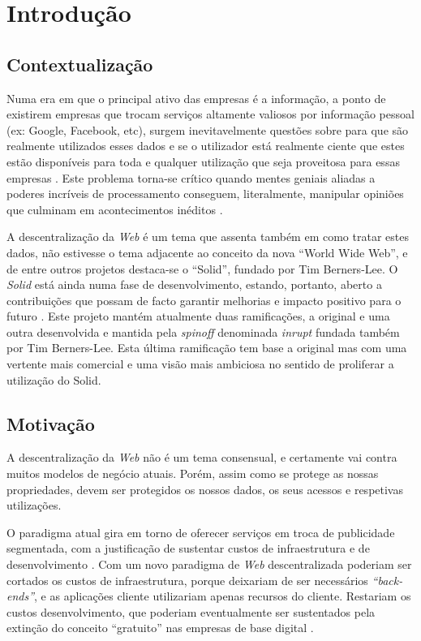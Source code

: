 \chapter{Introdução}
\label{cap:1}

\section{Contextualização}
Numa era em que o principal ativo das empresas é a informação, a ponto de existirem empresas que trocam serviços altamente valiosos por informação pessoal (ex: Google, Facebook, etc)\cite{top_three_issues_centralized_web}, surgem inevitavelmente questões sobre para que são realmente utilizados esses dados e se o utilizador está realmente ciente que estes estão disponíveis para toda e qualquer utilização que seja proveitosa para essas empresas \cite{facebook_data_hell_medium}. Este problema torna-se crítico quando mentes geniais aliadas a poderes incríveis de processamento conseguem, literalmente, manipular opiniões que culminam em acontecimentos inéditos \cite{cambridge_analytica}.

A descentralização da \emph{Web} é um tema que assenta também em como tratar estes dados, não estivesse o tema adjacente ao conceito da nova “World Wide Web”, e de entre outros projetos destaca-se o “Solid”, fundado por Tim Berners-Lee. O \emph{Solid} está ainda numa fase de desenvolvimento, estando, portanto, aberto a contribuições que possam de facto garantir melhorias e impacto positivo para o futuro \cite{why_web_decentralization_future}. Este projeto mantém atualmente duas ramificações, a original e uma outra desenvolvida e mantida pela \emph{spinoff} denominada \emph{inrupt} fundada também por Tim Berners-Lee. Esta última ramificação tem base a original mas com uma vertente mais comercial e uma visão mais ambiciosa no sentido de proliferar a utilização do Solid.

\section{Motivação}
A descentralização da \emph{Web} não é um tema consensual, e certamente vai contra muitos modelos de negócio atuais. Porém, assim como se protege as nossas propriedades, devem ser protegidos os nossos dados, os seus acessos e respetivas utilizações.

O paradigma atual gira em torno de oferecer serviços em troca de publicidade segmentada, com a justificação de sustentar custos de infraestrutura e de desenvolvimento \cite{top_three_issues_centralized_web}. Com um novo paradigma de \emph{Web} descentralizada poderiam ser cortados os custos de infraestrutura, porque deixariam de ser necessários \emph{“back-ends”}, e as aplicações cliente utilizariam apenas recursos do cliente. Restariam os custos desenvolvimento, que poderiam eventualmente ser sustentados pela extinção do conceito “gratuito” nas empresas de base digital \cite{why_web_decentralization_future}.

